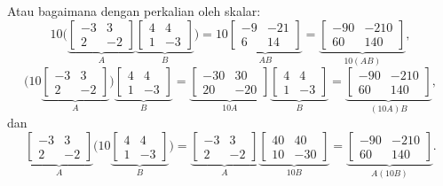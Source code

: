 \begin{example}
Atau bagaimana dengan perkalian oleh skalar:
\begin{equation*}
10
\biggl(
\underbrace{
\begin{bmatrix}
-3 & 3 \\ 2 & -2
\end{bmatrix}
}_A
\underbrace{
\begin{bmatrix}
4 & 4 \\ 1 & -3
\end{bmatrix}
}_B
\biggr)
=
10
\underbrace{
\begin{bmatrix}
-9 & -21 \\ 6 & 14
\end{bmatrix}
}_{A B}
=
\underbrace{
\begin{bmatrix}
-90 & -210 \\ 60 & 140
\end{bmatrix}
}_{10 (AB)} ,
\end{equation*}
\begin{equation*}
\biggl(
10
\underbrace{
\begin{bmatrix}
-3 & 3 \\ 2 & -2
\end{bmatrix}
}_A
\biggr)
\underbrace{
\begin{bmatrix}
4 & 4 \\ 1 & -3
\end{bmatrix}
}_B
=
\underbrace{
\begin{bmatrix}
-30 & 30 \\ 20 & -20
\end{bmatrix}
}_{10 A}
\underbrace{
\begin{bmatrix}
4 & 4 \\ 1 & -3
\end{bmatrix}
}_B
=
\underbrace{
\begin{bmatrix}
-90 & -210 \\ 60 & 140
\end{bmatrix}
}_{(10 A)B} ,
\end{equation*}
dan
\begin{equation*}
\underbrace{
\begin{bmatrix}
-3 & 3 \\ 2 & -2
\end{bmatrix}
}_A
\biggl(
10
\underbrace{
\begin{bmatrix}
4 & 4 \\ 1 & -3
\end{bmatrix}
}_B
\biggr)
=
\underbrace{
\begin{bmatrix}
-3 & 3 \\ 2 & -2
\end{bmatrix}
}_{A}
\underbrace{
\begin{bmatrix}
40 & 40 \\ 10 & -30
\end{bmatrix}
}_{10B}
=
\underbrace{
\begin{bmatrix}
-90 & -210 \\ 60 & 140
\end{bmatrix}
}_{A(10B)} .
\end{equation*}
\end{example}

